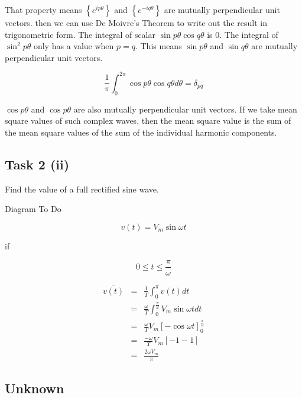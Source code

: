 \documentclass[a4paper,12pt]{article}
\begin{document}
That property means $\left\{ e^{i p \theta} \right\}$ and
$\left\{ e^{-i q \theta} \right\}$ are mutually perpendicular unit
vectors. then we can use De Moivre's Theorem to write out the result in
trigonometric form. The integral of scalar $\sin{p \theta}\cos{q
\theta}$ is $0$. The integral of $\sin^{2}{p \theta}$ only has a value
when $p = q$. This means $\sin{p \theta}$ and $\sin{q \theta}$ are
mutually perpendicular unit vectors.

\[ \frac{1}{\pi} \int^{2 \pi}_{0} \cos{p \theta}\cos{q \theta} d \theta =
\delta_{pq} \]

$\cos{p \theta}$ and $\cos{p \theta}$ are also mutually
perpendicular unit vectors. If we take mean square values of such
complex waves, then the mean square value is the sum of the mean square
values of the sum of the individual harmonic components.



\subsection{Task 2 (ii)}

Find the value of a full rectified sine wave.

\begin{table}[hbtp]

Diagram To Do

\end{table}

\[ v(t) = V_{m} \sin{\omega t} \]

if

\[ 0 \leq t \leq \frac{\pi}{\omega} \]

\begin{eqnarray*}
\overline{v(t)} & = & \frac{1}{T} \int^{\pi}_{0} v(t) dt \\
					 & = & \frac{\omega}{T} \int^{\frac{\pi}{\omega}}_{0}
					 V_{m}\sin{\omega t}dt \\
					 & = & \frac{\omega}{T} V_{m} \left[ - \cos{\omega t}
					 \right]^{\frac{\pi}{\omega}}_{0} \\
					 & = & \frac{- \omega}{T} V_{m} \left[ -1 -1 \right] \\
					 & = & \frac{2 \omega V_{m}}{\pi}
\end{eqnarray*}

\subsection{Unknown}
\end{document}

